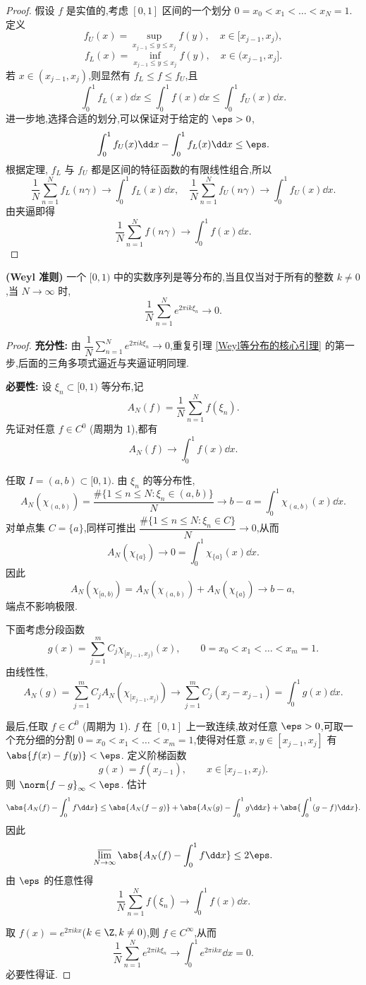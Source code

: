 \begin{proof}
假设 $f$ 是实值的,考虑 $[0,1]$ 区间的一个划分 $0=x_0<x_1<\ldots<x_N=1$. 定义
\[
f_U(x)=\sup_{x_{j-1}\leq y\leq x_j}f(y),\quad x\in[x_{j-1},x_j),
\]
\[
f_L(x)=\inf_{x_{j-1}\leq y\leq x_j}f(y),\quad x\in(x_{j-1},x_j].
\]
若 $x\in(x_{j-1},x_j)$,则显然有 $f_L\leq f\leq f_U$,且
\[
\int_0^1 f_L(x)\dd x\leq\int_0^1 f(x)\dd x\leq\int_0^1 f_U(x)\dd x.
\]
进一步地,选择合适的划分,可以保证对于给定的 $\eps>0$,
\[
\int_0^1 f_U(x)\dd x-\int_0^1 f_L(x)\dd x\leq\eps.
\]
根据定理, $f_L$ 与 $f_U$ 都是区间的特征函数的有限线性组合,所以
\[
\frac1N\sum_{n=1}^N f_L(n\gamma)\to\int_0^1 f_L(x)\dd x,
\quad
\frac1N\sum_{n=1}^N f_U(n\gamma)\to\int_0^1 f_U(x)\dd x.
\]
由夹逼即得
\[
\frac1N\sum_{n=1}^N f(n\gamma)\to\int_0^1 f(x)\dd x.
\]
\end{proof}

\begin{theorem}
\textbf{(Weyl 准则)}
一个 $[0,1)$ 中的实数序列是等分布的,当且仅当对于所有的整数 $k\neq0$,当 $N\to\infty$ 时,
\[
\frac1N\sum_{n=1}^N e^{2\pi ik\xi_n}\to0.
\]
\end{theorem}

\begin{proof}
\textbf{充分性:} 由 $\dfrac1N\sum\limits_{n=1}^N e^{2\pi ik\xi_n}\to0$,重复引理 \ref{Weyl等分布的核心引理} 的第一步,后面的三角多项式逼近与夹逼证明同理.

\textbf{必要性:} 设 $\xi_n\subset[0,1)$ 等分布,记
\[
A_N(f)=\frac1N\sum_{n=1}^N f(\xi_n).
\]
先证对任意 $f\in C^0$ (周期为 1),都有
\[
A_N(f)\to\int_0^1 f(x)\dd x.
\]

任取 $I=(a,b)\subset[0,1)$. 由 $\xi_n$ 的等分布性,
\[
A_N(\chi_{(a,b)})=\frac{\#\{1\leq n\leq N:\xi_n\in(a,b)\}}{N}\to b-a=\int_0^1\chi_{(a,b)}(x)\dd x.
\]
对单点集 $C=\{a\}$,同样可推出 $\dfrac{\#\{1\leq n\leq N:\xi_n\in C\}}{N}\to0$,从而
\[
A_N(\chi_{\{a\}})\to0=\int_0^1\chi_{\{a\}}(x)\dd x.
\]
因此
\[
A_N(\chi_{[a,b)})=A_N(\chi_{(a,b)})+A_N(\chi_{\{a\}})\to b-a,
\]
端点不影响极限.

下面考虑分段函数
\[
g(x)=\sum_{j=1}^m C_j\chi_{[x_{j-1},x_j)}(x),\qquad 0=x_0<x_1<\ldots<x_m=1.
\]
由线性性,
\[
A_N(g)=\sum_{j=1}^m C_jA_N(\chi_{[x_{j-1},x_j)})\to\sum_{j=1}^m C_j(x_j-x_{j-1})=\int_0^1 g(x)\dd x.
\]

最后,任取 $f\in C^0$ (周期为 1). $f$ 在 $[0,1]$ 上一致连续,故对任意 $\eps>0$,可取一个充分细的分割 $0=x_0<x_1<\ldots<x_m=1$,使得对任意 $x,y\in[x_{j-1},x_j]$ 有 $\abs{f(x)-f(y)}<\eps$. 定义阶梯函数
\[
g(x)=f(x_{j-1}),\qquad x\in[x_{j-1},x_j).
\]
则 $\norm{f-g}_\infty<\eps$. 估计
\[
\abs{A_N(f)-\int_0^1 f\dd x}
\leq\abs{A_N(f-g)}+\abs{A_N(g)-\int_0^1 g\dd x}+\abs{\int_0^1(g-f)\dd x}.
\]
因此
\[
\varlimsup_{N\to\infty}\abs{A_N(f)-\int_0^1 f\dd x}\leq2\eps.
\]
由 $\eps$ 的任意性得
\[
\frac1N\sum_{n=1}^N f(\xi_n)\to\int_0^1 f(x)\dd x.
\]

取 $f(x)=e^{2\pi ikx}$($k\in\Z,k\neq0$),则 $f\in C^\infty$,从而
\[
\frac1N\sum_{n=1}^N e^{2\pi ik\xi_n}\to\int_0^1 e^{2\pi ikx}\dd x=0.
\]
必要性得证.
\end{proof}
